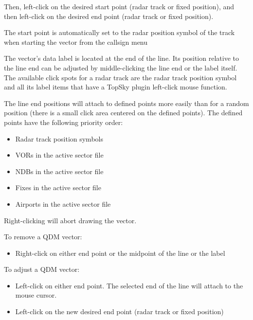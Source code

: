 \documentclass[a4paper,oneside,11pt]{memoir}
\begin{document}
Then, left-click on the desired start point (radar track or fixed position), and then left-click on the desired end point (radar track or fixed position).

The start point is automatically set to the radar position symbol of the track when starting the vector from the callsign menu

\bigskip

The vector’s data label is located at the end of the line. Its position relative to the line end can be adjusted by middle-clicking the line end or the label itself. The available click spots for a radar track are the radar track position symbol and all its label items that have a TopSky plugin left-click mouse function.

The line end positions will attach to defined points more easily than for a random position (there is a small click area centered on the defined points). The defined points have the following priority order:

\begin{itemize}
    \item Radar track position symbols
    \item VORs in the active sector file
    \item NDBs in the active sector file
    \item Fixes in the active sector file
    \item Airports in the active sector file
\end{itemize}

\bigskip

Right-clicking will abort drawing the vector.

\bigskip

To remove a QDM vector:

\begin{itemize}
    \item Right-click on either end point or the midpoint of the line or the label
\end{itemize}

\bigskip

To adjust a QDM vector:

\begin{itemize}
    \item Left-click on either end point. The selected end of the line will attach to the mouse cursor.
    \item Left-click on the new desired end point (radar track or fixed position)
\end{itemize}
\end{document}

